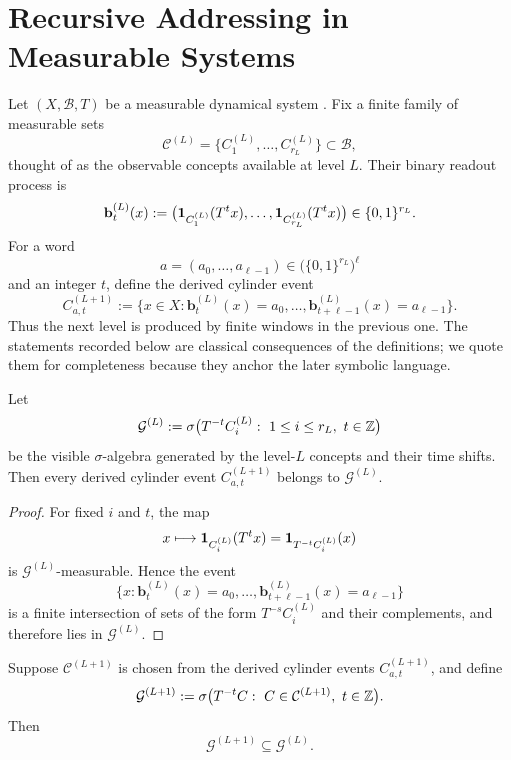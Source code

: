 \section{Recursive Addressing in Measurable Systems}
\label{sec:measurable}

Let $(X,\mathcal{B},T)$ be a measurable dynamical system
\cite{WaltersErgodicTheory}.  Fix a finite
family of measurable sets
\[
\mathcal{C}^{(L)} = \{C_1^{(L)},\dots,C_{r_L}^{(L)}\}\subset \mathcal{B},
\]
thought of as the observable concepts available at level $L$.  Their binary
readout process is
\[
\mathbf{b}^{(L)}_t(x)
:=
\bigl(
\mathbf{1}_{C_1^{(L)}}(T^t x),\dots,\mathbf{1}_{C_{r_L}^{(L)}}(T^t x)
\bigr)\in\{0,1\}^{r_L}.
\]
For a word
\[
a=(a_0,\dots,a_{\ell-1})\in \bigl(\{0,1\}^{r_L}\bigr)^\ell
\]
and an integer $t$, define the derived cylinder event
\[
C_{a,t}^{(L+1)}
:=
\{x\in X:\mathbf{b}^{(L)}_t(x)=a_0,\dots,\mathbf{b}^{(L)}_{t+\ell-1}(x)=a_{\ell-1}\}.
\]
Thus the next level is produced by finite windows in the previous one.  The
statements recorded below are classical consequences of the definitions; we
quote them for completeness because they anchor the later symbolic language.

\begin{proposition}
\label{prop:recursive-addressing-refinement}
Let
\[
\mathcal{G}^{(L)}
:=
\sigma\bigl(T^{-t}C_i^{(L)}:\ 1\le i\le r_L,\ t\in\mathbb{Z}\bigr)
\]
be the visible $\sigma$-algebra generated by the level-$L$ concepts and their
time shifts.  Then every derived cylinder event $C_{a,t}^{(L+1)}$ belongs to
$\mathcal{G}^{(L)}$.
\end{proposition}

\begin{proof}
For fixed $i$ and $t$, the map
\[
x\longmapsto \mathbf{1}_{C_i^{(L)}}(T^t x)=\mathbf{1}_{T^{-t}C_i^{(L)}}(x)
\]
is $\mathcal{G}^{(L)}$-measurable.  Hence the event
\[
\{x:\mathbf{b}^{(L)}_t(x)=a_0,\dots,\mathbf{b}^{(L)}_{t+\ell-1}(x)=a_{\ell-1}\}
\]
is a finite intersection of sets of the form $T^{-s}C_i^{(L)}$ and their
complements, and therefore lies in $\mathcal{G}^{(L)}$.
\end{proof}

\begin{corollary}
\label{cor:recursive-addressing-visible-sigma-nonexpansion}
Suppose $\mathcal{C}^{(L+1)}$ is chosen from the derived cylinder events
$C_{a,t}^{(L+1)}$, and define
\[
\mathcal{G}^{(L+1)}
:=
\sigma\bigl(T^{-t}C:\ C\in \mathcal{C}^{(L+1)},\ t\in\mathbb{Z}\bigr).
\]
Then
\[
\mathcal{G}^{(L+1)}\subseteq \mathcal{G}^{(L)}.
\]
\end{corollary}

